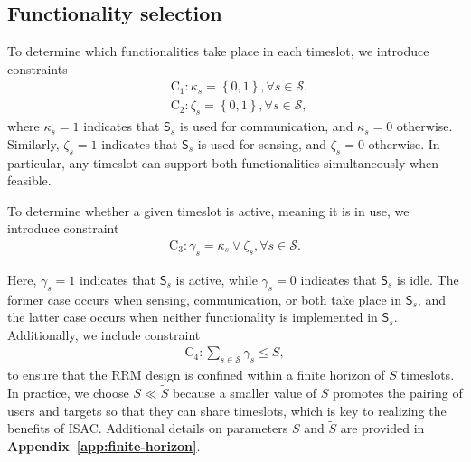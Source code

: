 \documentclass[10pt,journal,compsoc]{IEEEtran}
\theoremstyle{myremark}
\theoremstyle{myexample}
\begin{document}
\subsection{Functionality selection} 
To determine which functionalities take place in each timeslot, we introduce constraints
\begin{align*}  
	& \mathrm{C}_{1}: \kappa_s = \left\lbrace 0, 1 \right\rbrace, \forall s \in \mathcal{S},   
	\\
	& \mathrm{C}_{2}: \zeta_s = \left\lbrace 0, 1 \right\rbrace, \forall s \in \mathcal{S},   
\end{align*}
where $ \kappa_s = 1 $ indicates that $ \mathsf{S}_s $ is used for communication, and $ \kappa_s = 0 $ otherwise. Similarly, $ \zeta_s = 1 $ indicates that $ \mathsf{S}_s $ is used for sensing, and $ \zeta_s = 0 $ otherwise. In particular, any timeslot can support both functionalities simultaneously when feasible.


To determine whether a given timeslot is active, meaning it is in use, we introduce constraint
\begin{align*}  
	\mathrm{C}_{3}: \gamma_s = \kappa_s \lor \zeta_s, \forall s \in \mathcal{S}. 
\end{align*}

Here, $ \gamma_s = 1 $ indicates that $ \mathsf{S}_s $ is active, while $ \gamma_s = 0 $ indicates that $ \mathsf{S}_s $ is idle. The former case occurs when sensing, communication, or both take place in $ \mathsf{S}_s $, and the latter case occurs when neither functionality is implemented in $ \mathsf{S}_s $. Additionally, we include constraint
\begin{align*}  
	\textstyle
	\mathrm{C}_{4}: \sum_{ s \in \mathcal{S} } \gamma_s \leq S, 
\end{align*}
to ensure that the \gls{RRM} design is confined within a finite horizon of $ S $ timeslots. In practice, we choose $ S \ll \widetilde{S} $ because a smaller value of $ S $ promotes the pairing of users and targets so that they can share timeslots, which is key to realizing the benefits of ISAC. Additional details on parameters $ S $ and $ \widetilde{S} $ are provided in \textbf{Appendix~\ref{app:finite-horizon}}.




\end{document}
